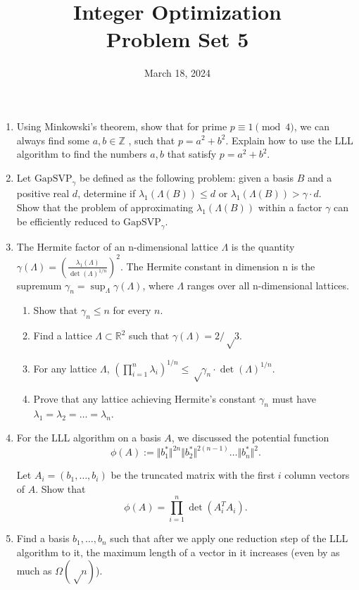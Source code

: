 \documentclass[11pt,a4paper]{article}
\title{Integer Optimization  \\ Problem Set 5 }
\date{ March 18, 2024}
\renewcommand{\leq}{\leqslant}
\begin{document}
\maketitle 


\begin{enumerate}
\item
Using Minkowski's theorem, show that for prime $p\equiv 1 \pmod{4}$, we can always find some $a,b ∈ \mathbb{Z}$ , such that $p=a^2+b^2$. Explain how to use the LLL algorithm to find the numbers $a, b$ that satisfy $p = a^2 + b^2$.

\item Let $\text{GapSVP}_γ$ be defined as the following problem: given a basis $B$ and a positive real $d$, determine if $λ_1(\Lambda(B)) ≤ d$ or $λ_1(\Lambda(B)) > γ\cdot d$.\\
Show that the problem of approximating $λ_1(\Lambda(B))$ within a factor $γ$ can be efficiently reduced to $\text{GapSVP}_γ$.


\item The Hermite factor of an n-dimensional lattice $Λ$ is the quantity $γ(Λ) = \left(\frac{λ_1(Λ)}{ \det(Λ)^{1/n}}\right)^2$. The Hermite constant in dimension n is the supremum $γ_n = \sup_Λ γ(Λ)$, where $Λ$ ranges over all n-dimensional lattices.
\begin{enumerate}
    \item Show that $\gamma_n \leq n$ for every $n$.
    \item Find a lattice $Λ ⊂ \mathbb{R}^2$ such that $γ(Λ) = 2/√3$.
    \item For any lattice $Λ$, $(\prod_{i=1}^n λ_i)^{1/n} ≤ √γ_n \cdot \det(Λ)^{1/n}$.
    \item Prove that any lattice achieving Hermite's constant $\gamma_n$ must have $\lambda_1 = \lambda_2 = \hdots = \lambda_n$. 
\end{enumerate}

\item For the LLL algorithm on a basis $A$, we discussed the potential function 
$$\phi(A) := \Vert b_1^\ast \Vert^{2n} \Vert b_2^\ast \Vert^{2(n-1)} \hdots \Vert b_n^\ast \Vert^{2}.$$

Let $A_i = (b_1, \hdots, b_i)$ be the truncated matrix with the first $i$ column vectors of $A$. Show that $$\phi(A) = \displaystyle\prod_{i = 1}^n \det(A_i^T A_i).$$ 

\item Find a basis $b_1, \hdots , b_n$ such that after we apply one reduction step of the LLL algorithm to it, the maximum length of a vector in it increases (even by as much as $Ω(√n)$).





    
\end{enumerate}


%
%


 
\end{document}
